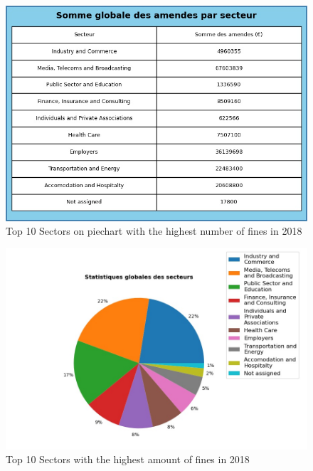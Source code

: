 \documentclass[12pt]{article}
\begin{document}
		
	\begin{multicols}{2}
	\begin{figure}
		[H]\centering\includegraphics[width=1.0\linewidth]{graphs/sector_data_year_fines}
		\caption{Top 10 Sectors on piechart with the highest number of fines in 2018}
	\end{figure}
	\begin{figure}
		[H]\centering\includegraphics[width=1\linewidth]{graphs/sector_data_year}
		\caption{Top 10 Sectors with the highest amount of fines in 2018}
	 \end{figure}
	
	\end{multicols}
\end{document}

